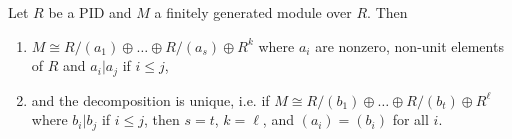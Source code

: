 \begin{theorem}
  Let $R$ be a PID and $M$ a finitely generated
  module over $R$. Then
  \begin{enumerate}
    \item $M \cong R / (a_1) \oplus \dots \oplus R / (a_s) \oplus R^k$
      where $a_i$ are nonzero, non-unit elements of
      $R$ and $a_i | a_j$ if $i \le j$,
    \item and the decomposition is unique, i.e.
      if $M \cong R / (b_1) \oplus \dots \oplus R / (b_t) \oplus R^\ell$
      where $b_i | b_j$ if $i \le j$, then $s = t$,
      $k = \ell$, and $(a_i) = (b_i)$ for all $i$.
  \end{enumerate}
\end{theorem}

